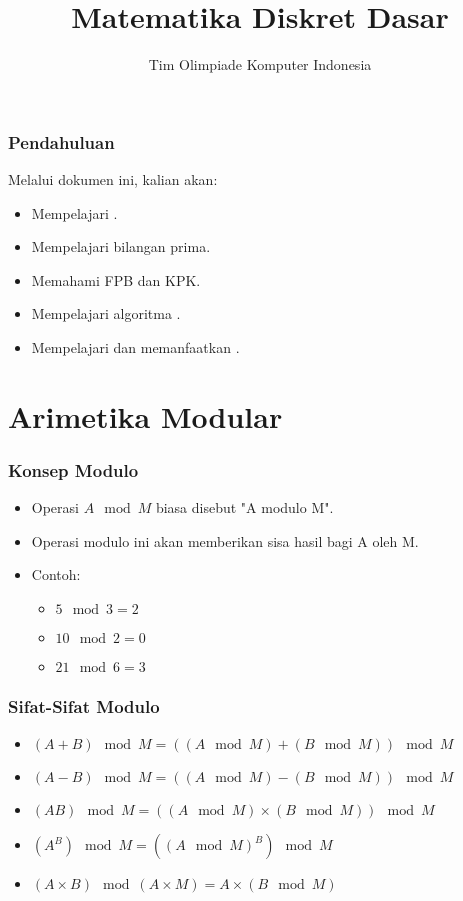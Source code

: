 

\title{Matematika Diskret Dasar}
\author{Tim Olimpiade Komputer Indonesia}
\date{}



\begin{frame}
\titlepage
\end{frame}

\begin{frame}
\frametitle{Pendahuluan}
Melalui dokumen ini, kalian akan:
\begin{itemize}
  \item Mempelajari .
  \item Mempelajari bilangan prima.
  \item Memahami FPB dan KPK.
  \item Mempelajari algoritma .
  \item Mempelajari dan memanfaatkan .
\end{itemize}
\end{frame}

\section{Arimetika Modular}
\frame{\sectionpage}

\begin{frame}
\frametitle{Konsep Modulo}
\begin{itemize}
  \item Operasi $A \mod M$ biasa disebut "A modulo M".
  \item Operasi modulo ini akan memberikan sisa hasil bagi A oleh M.
  \item Contoh: 
  \begin{itemize}
    \item $5 \mod 3 = 2$ 
    \item $10 \mod 2 = 0$
    \item $21 \mod 6 = 3$
  \end{itemize}  
\end{itemize}
\end{frame}

\begin{frame}
\frametitle{Sifat-Sifat Modulo}
\begin{itemize}
  \item $(A + B) \mod M = ((A \mod M) + (B \mod M)) \mod M$
  \item $(A - B) \mod M = ((A \mod M) - (B \mod M)) \mod M$
  \item $(AB) \mod M = ((A \mod M) \times (B \mod M)) \mod M$  
  \item $(A^{B}) \mod M = ((A \mod M)^{B}) \mod M$
  \item $(A \times B) \mod (A \times M) = A \times (B \mod M)$
\end{itemize}
\end{frame} 

